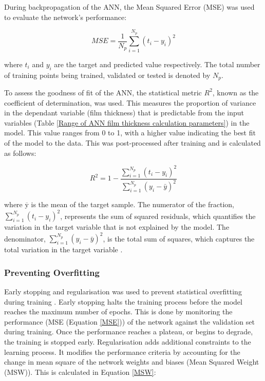 During backpropagation of the ANN, the Mean Squared Error (MSE) was used to evaluate the network's performance:

\begin{equation}\label{MSE}
	M S E=\frac{1}{N_p} \sum_{i=1}^{N_p}\left(t_i-y_i\right)^2
\end{equation}

where $t_i$ and $y_i$ are the target and predicted value respectively. The total number of training points being trained, validated or tested is denoted by $N_p$. 

To assess the goodness of fit of the ANN, the statistical metric $R^2$, known as the coefficient of determination, was used. This measures the proportion of variance in the dependant variable (film thickness) that is predictable from the input variables (Table \ref{Range of ANN film thickness calculation parameters}) in the model. This value ranges from 0 to 1, with a higher value indicating the best fit of the model to the data. This was post-processed after training and is calculated as follows:

\begin{equation}\label{R-squared}
	R^2=1-\frac{\sum_{i=1}^{N_p}\left(t_i-y_i\right)^2}{\sum_{i=1}^{N_p}\left(y_i-\bar{y}\right)^2}
\end{equation}

 where $\overline{\mathrm{y}}$ is the mean of the target sample. The numerator of the fraction, \( \sum_{i=1}^{N_p}(t_i - y_i)^2 \), represents the sum of squared residuals, which quantifies the variation in the target variable that is not explained by the model. The denominator, \( \sum_{i=1}^{N_p}(y_i - \bar{y})^2 \), is the total sum of squares, which captures the total variation in the target variable \cite{Marian2022}.

\subsubsection{Preventing Overfitting} \label{Preventing overfitting}

Early stopping and regularisation was used to prevent statistical overfitting during training \cite{MatlabOverfit}. Early stopping halts the training process before the model reaches the maximum number of epochs. This is done by monitoring the performance (MSE (Equation \ref{MSE})) of the network against the validation set during training. Once the performance reaches a plateau, or begins to degrade, the training is stopped early. Regularisation adds additional constraints to the learning process. It modifies the performance criteria by accounting for the change in mean square of the network weights and biases (Mean Squared Weight (MSW)). This is calculated in Equation \ref{MSW}: 


